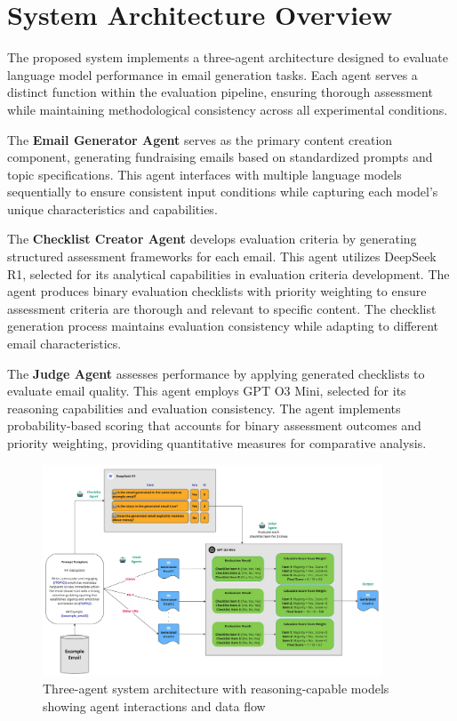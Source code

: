 \section{System Architecture Overview}
\label{sec:system-architecture}

The proposed system implements a three-agent architecture designed to evaluate language model performance in email generation tasks. Each agent serves a distinct function within the evaluation pipeline, ensuring thorough assessment while maintaining methodological consistency across all experimental conditions.

The \textbf{Email Generator Agent} serves as the primary content creation component, generating fundraising emails based on standardized prompts and topic specifications. This agent interfaces with multiple language models sequentially to ensure consistent input conditions while capturing each model's unique characteristics and capabilities.

The \textbf{Checklist Creator Agent} develops evaluation criteria by generating structured assessment frameworks for each email. This agent utilizes DeepSeek R1, selected for its analytical capabilities in evaluation criteria development. The agent produces binary evaluation checklists with priority weighting to ensure assessment criteria are thorough and relevant to specific content. The checklist generation process maintains evaluation consistency while adapting to different email characteristics.

The \textbf{Judge Agent} assesses performance by applying generated checklists to evaluate email quality. This agent employs GPT O3 Mini, selected for its reasoning capabilities and evaluation consistency. The agent implements probability-based scoring that accounts for binary assessment outcomes and priority weighting, providing quantitative measures for comparative analysis.

\begin{figure}[htbp]
    \centering
    \includegraphics[width=0.9\textwidth]{figures/agent-diagram.png}
    \caption{Three-agent system architecture with reasoning-capable models showing agent interactions and data flow}
    \label{fig:system-architecture}
\end{figure}

